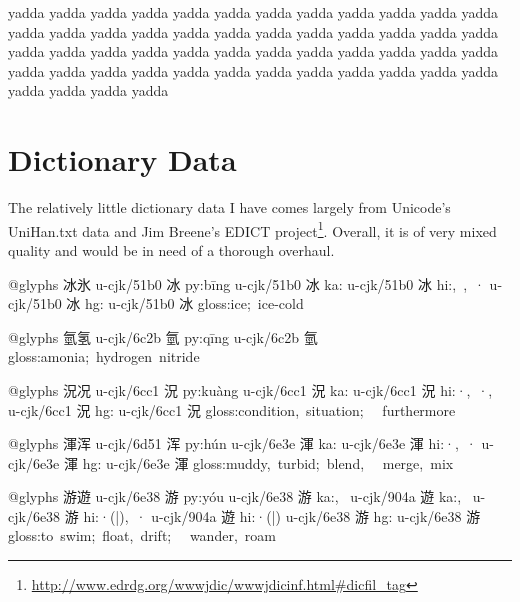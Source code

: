 \begin{multicols}{2}
\endgroup{}{}

\endgroup{}yadda yadda yadda yadda yadda yadda yadda yadda yadda yadda yadda yadda yadda
yadda yadda yadda yadda yadda yadda yadda yadda yadda yadda yadda yadda yadda
yadda yadda yadda yadda yadda yadda yadda yadda yadda yadda yadda yadda yadda
yadda yadda yadda yadda yadda yadda yadda yadda yadda yadda yadda yadda yadda\mktsShowpar\par
\end{multicols}\null\newpage{}\begin{multicols}{2}\end{multicols}
\section{Dictionary Data
}
\begin{multicols}{2}The relatively little dictionary data I have comes largely
from Unicode’s {\mktsStyleCode{}UniHan.txt} data and Jim Breene’s EDICT
project\footnote{\url{http://www.edrdg.org/wwwjdic/wwwjdicinf.html\#dicfil\_tag}}.
Overall, it is of very mixed quality and would be in need of a
thorough overhaul.\mktsShowpar\par
\begingroup\mktsObeyAllLines{}

\begingroup\mktsStyleCode{}@glyphs	{\cjk{}冰氷} 
u-cjk/51b0	{\cjk{}冰}	py:bīng 
u-cjk/51b0	{\cjk{}冰}	ka:{} 
u-cjk/51b0	{\cjk{}冰}	hi:{}, {}, {}·{} 
u-cjk/51b0	{\cjk{}冰}	hg:{} 
u-cjk/51b0	{\cjk{}冰}	gloss:ice; ice-cold 
 
@glyphs	{\cjk{}氫氢} 
u-cjk/6c2b	{\cjk{}氫}	py:qīng 
u-cjk/6c2b	{\cjk{}氫}	gloss:amonia; hydrogen nitride 
 
@glyphs	{\cjk{}況况} 
u-cjk/6cc1	{\cjk{}況}	py:kuàng 
u-cjk/6cc1	{\cjk{}況}	ka:{} 
u-cjk/6cc1	{\cjk{}況}	hi:{}·{}, {}·{}, {} 
u-cjk/6cc1	{\cjk{}況}	hg:{} 
u-cjk/6cc1	{\cjk{}況}	gloss:condition, situation;
  furthermore 
 
@glyphs	{\cjk{}渾浑} 
u-cjk/6d51	{\cjk{}浑}	py:hún 
u-cjk/6e3e	{\cjk{}渾}	ka:{} 
u-cjk/6e3e	{\cjk{}渾}	hi:{}·{}, {}·{} 
u-cjk/6e3e	{\cjk{}渾}	hg:{} 
u-cjk/6e3e	{\cjk{}渾}	gloss:muddy, turbid; blend,
  merge, mix 
 
@glyphs	{\cjk{}游遊} 
u-cjk/6e38	{\cjk{}游}	py:yóu 
u-cjk/6e38	{\cjk{}游}	ka:{}, {} 
u-cjk/904a	{\cjk{}遊}	ka:{}, {} 
u-cjk/6e38	{\cjk{}游}	hi:{}·({}|{}), {}·{} 
u-cjk/904a	{\cjk{}遊}	hi:{}·({}|{}) 
u-cjk/6e38	{\cjk{}游}	hg:{} 
u-cjk/6e38	{\cjk{}游}	gloss:to swim; float, drift;
  wander, roam 
\endgroup{}{}

\endgroup{}\end{multicols}\null\newpage{}\begin{multicols}{2}\end{multicols}

